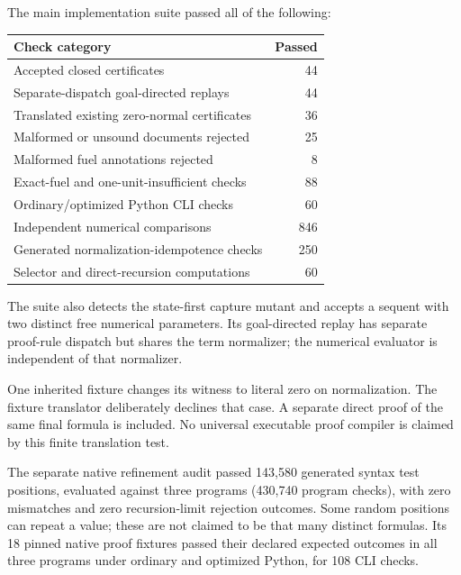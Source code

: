 The main implementation suite passed all of the following:
\begin{center}\small
\begin{tabular}{@{}lr@{}}
\toprule
Check category & Passed\\\midrule
Accepted closed certificates & 44\\
Separate-dispatch goal-directed replays & 44\\
Translated existing zero-normal certificates & 36\\
Malformed or unsound documents rejected & 25\\
Malformed fuel annotations rejected & 8\\
Exact-fuel and one-unit-insufficient checks & 88\\
Ordinary/optimized Python CLI checks & 60\\
Independent numerical comparisons & 846\\
Generated normalization-idempotence checks & 250\\
Selector and direct-recursion computations & 60\\\bottomrule
\end{tabular}
\end{center}
The suite also detects the state-first capture mutant and accepts a
sequent with two distinct free numerical parameters. Its goal-directed
replay has separate proof-rule dispatch but shares the term normalizer;
the numerical evaluator is independent of that normalizer.

One inherited fixture changes its witness to literal zero on normalization.
The fixture translator deliberately declines that case. A separate direct
proof of the same final formula is included. No universal executable proof
compiler is claimed by this finite translation test.

The separate native refinement audit passed 143,580 generated syntax test
positions, evaluated against three programs (430,740 program checks), with
zero mismatches and zero recursion-limit rejection outcomes. Some random
positions can repeat a value; these are not claimed to be that many
distinct formulas. Its 18 pinned native proof fixtures passed their
declared expected outcomes in all three programs under ordinary and
optimized Python, for 108 CLI checks.
